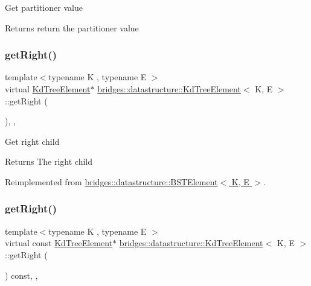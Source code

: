 Get partitioner value \begin{DoxyReturn}{Returns}
return the partitioner value 
\end{DoxyReturn}
\mbox{\label{classbridges_1_1datastructure_1_1_kd_tree_element_a366e3b0987169220d3a145043be2373d}} 
\subsubsection{\texorpdfstring{get\+Right()}{getRight()}\hspace{0.1cm}{\footnotesize\ttfamily [1/2]}}
{\footnotesize\ttfamily template$<$typename K , typename E $>$ \\
virtual \hyperlink{classbridges_1_1datastructure_1_1_kd_tree_element}{Kd\+Tree\+Element}$\ast$ \hyperlink{classbridges_1_1datastructure_1_1_kd_tree_element}{bridges\+::datastructure\+::\+Kd\+Tree\+Element}$<$ K, E $>$\+::get\+Right (\begin{DoxyParamCaption}{ }\end{DoxyParamCaption})\hspace{0.3cm}{\ttfamily [inline]}, {\ttfamily [override]}, {\ttfamily [virtual]}}

Get right child \begin{DoxyReturn}{Returns}
The right child 
\end{DoxyReturn}


Reimplemented from \hyperlink{classbridges_1_1datastructure_1_1_b_s_t_element_a80f5085d6d03805dd3091b7693d8e235}{bridges\+::datastructure\+::\+B\+S\+T\+Element$<$ K, E $>$}.

\mbox{\label{classbridges_1_1datastructure_1_1_kd_tree_element_ae8d6007d3848b72cbfc11d2e29120781}} 
\subsubsection{\texorpdfstring{get\+Right()}{getRight()}\hspace{0.1cm}{\footnotesize\ttfamily [2/2]}}
{\footnotesize\ttfamily template$<$typename K , typename E $>$ \\
virtual const \hyperlink{classbridges_1_1datastructure_1_1_kd_tree_element}{Kd\+Tree\+Element}$\ast$ \hyperlink{classbridges_1_1datastructure_1_1_kd_tree_element}{bridges\+::datastructure\+::\+Kd\+Tree\+Element}$<$ K, E $>$\+::get\+Right (\begin{DoxyParamCaption}{ }\end{DoxyParamCaption}) const\hspace{0.3cm}{\ttfamily [inline]}, {\ttfamily [override]}, {\ttfamily [virtual]}}

